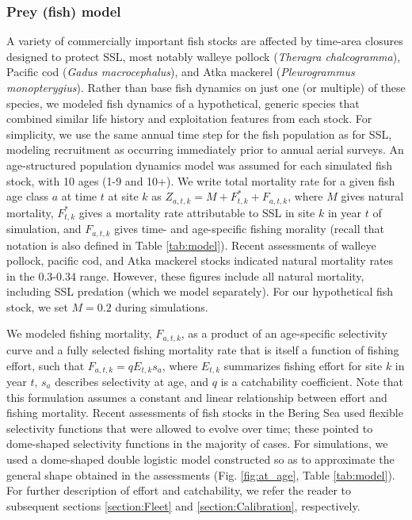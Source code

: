 \documentclass[11pt]{article}
\begin{document}
\subsubsection{Prey (fish) model}

A variety of commercially important fish stocks are affected by time-area closures designed to protect SSL, most notably walleye pollock ({\it Theragra chalcogramma}), Pacific cod ({\it Gadus macrocephalus}), and Atka mackerel ({\it Pleurogrammus monopterygius}).  Rather than base fish dynamics on just one (or multiple) of these species, we modeled fish dynamics of a hypothetical, generic species that combined similar life history and exploitation features from each stock.  For simplicity, we use the same annual time step for the fish population as for SSL, modeling recruitment as occurring immediately prior to annual aerial surveys.  An age-structured population dynamics model was assumed for each simulated fish stock, with 10 ages (1-9 and 10+).
We write total mortality rate for a given fish age class $a$ at time $t$ at site $k$ as $Z_{a,t,k}=M + F_{t,k}^* + F_{a,t,k}$, where $M$ gives
natural mortality, $F_{t,k}^*$ gives a mortality rate attributable to SSL in site $k$ in year $t$ of simulation, and $F_{a,t,k}$ gives time- and age-specific fishing morality (recall that notation is also defined in Table \ref{tab:model}).  Recent assessments of walleye pollock, pacific cod, and Atka mackerel stocks \citep[e.g.][]{PollockAssessment2011,PacCodAssessment2011,AtkaAssessment2012} indicated natural mortality rates in the 0.3-0.34 range.  However, these figures include all natural mortality, including SSL predation (which we model separately).  For our hypothetical fish stock, we set $M=0.2$ during simulations.

We modeled fishing mortality, $F_{a,t,k}$, as a product of an age-specific selectivity curve and a fully selected fishing mortality rate that is itself a function of fishing effort, such that $F_{a,t,k}=q E_{t,k} s_a$, where $E_{t,k}$ summarizes fishing effort for site $k$ in year $t$, $s_a$ describes selectivity at age, and $q$ is a catchability coefficient. Note that this formulation assumes a constant and linear relationship between effort and fishing mortality.  Recent assessments of fish stocks in the Bering Sea used flexible selectivity functions that were allowed to evolve over time; these pointed to dome-shaped selectivity functions in the majority of cases.  For simulations, we used a dome-shaped double logistic model constructed so as to approximate the general shape obtained in the assessments (Fig. \ref{fig:at_age}, Table \ref{tab:model}).  For further description of effort and catchability, we refer the reader to subsequent sections \ref{section:Fleet} and \ref{section:Calibration}, respectively.
\end{document}
